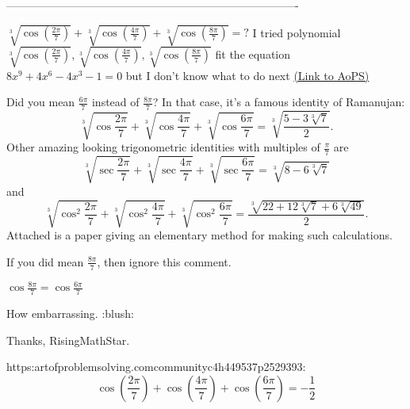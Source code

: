 -------------------------------------------------------------------------------

\begin{problem}
	$\sqrt[3]{\cos( \frac{2\pi}{7})}+\sqrt[3]{\cos( \frac{4\pi}{7})}+\sqrt[3]{\cos( \frac{8\pi}{7})}=?$
I tried polynomial 
$\sqrt[3]{\cos( \frac{2\pi}{7})},\sqrt[3]{\cos( \frac{4\pi}{7})},\sqrt[3]{\cos( \frac{8\pi}{7})}$ fit the equation
$8x^9+4x^6-4x^3-1=0$
but I don't know what to do next
	\flushright \href{https://artofproblemsolving.com/community/c6h421252}{(Link to AoPS)}
\end{problem}



\begin{solution}
	Did you mean $\frac{6\pi}{7}$ instead of $\frac{8\pi}{7}$? In that case, it's a famous identity of Ramanujan:
\[ \sqrt[3]{\cos\frac{2\pi}{7}}+\sqrt[3]{\cos\frac{4\pi}{7}}+\sqrt[3]{\cos\frac{6\pi}{7}}
=\sqrt[3]{\frac{5-3\sqrt[3]{7}}{2}}.\]Other amazing looking trigonometric identities with multiples of $\frac{\pi}{7}$ are
\[ \sqrt[3]{\sec\frac{2\pi}{7}}+\sqrt[3]{\sec\frac{4\pi}{7}}+\sqrt[3]{\sec\frac{6\pi}{7}}
=\sqrt[3]{8-6\sqrt[3]{7}} \]and
\[ \sqrt[3]{\cos^2\frac{2\pi}{7}}+\sqrt[3]{\cos^2\frac{4\pi}{7}}+\sqrt[3]{\cos^2\frac{6\pi}{7}}
=\frac{\sqrt[3]{22+12\sqrt[3]{7}+6\sqrt[3]{49}}}{2}.\]Attached is a paper giving an elementary method for making such calculations.

If you did mean $\frac{8\pi}{7}$, then ignore this comment.
\end{solution}



\begin{solution}
	$\cos \frac {8\pi} 7 = \cos \frac {6\pi} 7$
\end{solution}



\begin{solution}
	How embarrassing. :blush:

Thanks, RisingMathStar.
\end{solution}



\begin{solution}
	https:\/\/artofproblemsolving.com\/community\/c4h449537p2529393:
\[\cos{\left(\frac{2\pi}{7}\right)}+\cos{\left(\frac{4\pi}{7}\right)}+\cos{\left(\frac{6\pi}{7}\right)}=-\frac{1}{2}\]
\end{solution}



